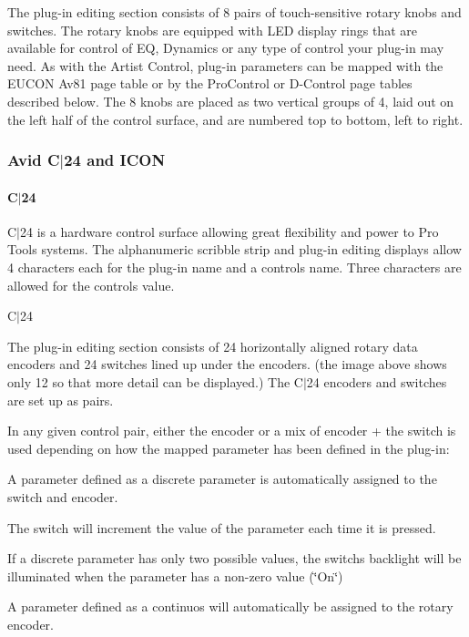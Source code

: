 The plug-\/in editing section consists of 8 pairs of touch-\/sensitive rotary knobs and switches. The rotary knobs are equipped with L\+ED display rings that are available for control of EQ, Dynamics or any type of control your plug-\/in may need. As with the Artist Control, plug-\/in parameters can be mapped with the E\+U\+C\+ON {\ttfamily Av81} page table or by the Pro\+Control or D-\/\+Control page tables described below. The 8 knobs are placed as two vertical groups of 4, laid out on the left half of the control surface, and are numbered top to bottom, left to right. \hypertarget{a00833_subsection__avid_c24_and_icon}{}\subsubsection{Avid C$\vert$24 and I\+C\+ON}\label{a00833_subsection__avid_c24_and_icon}
 \hypertarget{a00833_subsubsection__c24_}{}\paragraph{C$\vert$24}\label{a00833_subsubsection__c24_}
 C$\vert$24 is a hardware control surface allowing great flexibility and power to Pro Tools systems. The alphanumeric scribble strip and plug-\/in editing displays allow 4 characters each for the plug-\/in name and a control\textquotesingle{}s name. Three characters are allowed for the control\textquotesingle{}s value.

  C$\vert$24 

The plug-\/in editing section consists of 24 horizontally aligned rotary data encoders and 24 switches lined up under the encoders. (the image above shows only 12 so that more detail can be displayed.) The C$\vert$24 encoders and switches are set up as pairs.

In any given control pair, either the encoder or a mix of encoder + the switch is used depending on how the mapped parameter has been defined in the plug-\/in\+:


\begin{DoxyItemize}
\item A parameter defined as a discrete parameter is automatically assigned to the switch and encoder. 
\begin{DoxyItemize}
\item The switch will increment the value of the parameter each time it is pressed.  
\item If a discrete parameter has only two possible values, the switch\textquotesingle{}s backlight will be illuminated when the parameter has a non-\/zero value (\char`\"{}\+On\char`\"{})  
\end{DoxyItemize}
\item A parameter defined as a continuos will automatically be assigned to the rotary encoder.  
\end{DoxyItemize}

